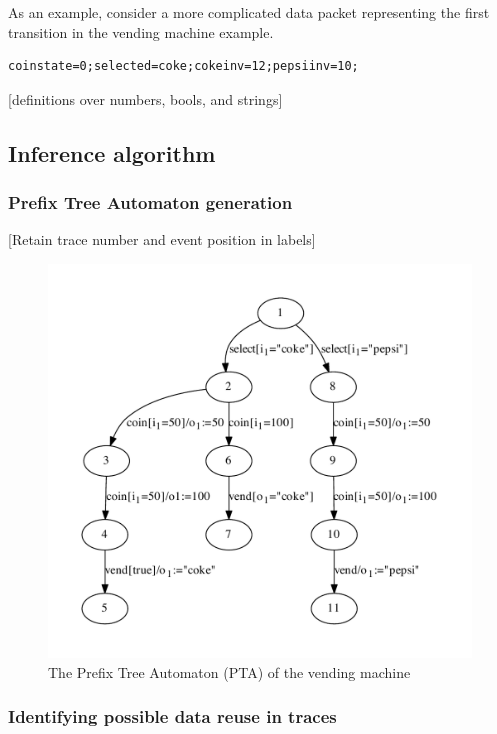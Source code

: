 As an example, consider a more complicated data packet representing the first transition in the vending machine example.

\begin{verbatim}
coinstate=0;selected=coke;cokeinv=12;pepsiinv=10;
\end{verbatim}

[definitions over numbers, bools, and strings]

\subsection{Inference algorithm}
\label{Algorithm}

\subsubsection{Prefix Tree Automaton generation}
\label{PTA}

[Retain trace number and event position in labels]

\begin{figure}[h]
\begin{center}
\includegraphics[width=12cm]{figures/efsm/vend1.pdf}
\caption{The Prefix Tree Automaton (PTA) of the vending machine}
\label{fig:pta}
\end{center}
\end{figure}

\subsubsection{Identifying possible data reuse in traces}
\label{IntratraceDependencies}

